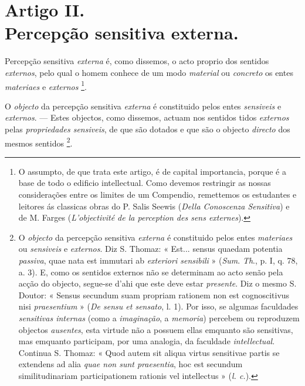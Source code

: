 
\section*{Artigo II.\\ Percepção sensitiva externa.}


Percepção sensitiva \emph{externa} é, como dissemos, o acto proprio dos sentidos \emph{externos}, pelo qual o homem conhece de um modo \emph{material} ou \emph{concreto} os entes \emph{materiaes} e \emph{externos} \footnote{O assumpto, de que trata este artigo, é de capital importancia, porque é a base de todo o edificio intellectual. Como devemos restringir as nossas considerações entre os limites de um Compendio, remettemos os estudantes e leitores ás classicas obras do P. Salis Seewis (\emph{Della Conoscenza Sensitiva}) e de M. Farges (\emph{L'objectivité de la perception des sens externes}).}.


O \emph{objecto} da percepção sensitiva \emph{externa} é constituido pelos entes \emph{sensiveis} e \emph{externos}. --- Estes objectos, como dissemos, actuam nos sentidos   tidos \emph{externos} pelas \emph{propriedades sensiveis}, de que são dotados e que são o objecto \emph{directo} dos mesmos sentidos \footnote{O \emph{objecto} da percepção sensitiva \emph{externa} é constituido pelos entes \emph{materiaes} ou \emph{sensiveis} e \emph{externos}. Diz S. Thomaz: « Est... sensus quaedam potentia \emph{passiva}, quae nata est immutari ab \emph{exteriori sensibili} » (\emph{Sum}. \emph{Th}., p. I, q. 78, a. 3). E, como os sentidos externos não se determinam ao acto senão pela acção do objecto, segue-se d'ahi que este deve estar \emph{presente}. Diz o mesmo S. Doutor: « Sensus secundum suam propriam rationem non est cognoscitivus nisi \emph{praesentium} » (\emph{De sensu et sensato}, l. 1). Por isso, se algumas faculdades \emph{sensitivas internas} (como a \emph{imaginação}, a \emph{memoria}) percebem ou reproduzem objectos \emph{ausentes}, esta virtude não a possuem ellas emquanto são sensitivas, mas emquanto participam, por uma analogia, da faculdade \emph{intellectual}. Continua S. Thomaz: « Quod autem sit aliqua virtus sensitivae partis se extendens ad alia \emph{quae non sunt praesentia}, hoc est secundum similitudinariam participationem rationis vel intellectus » (\emph{l. c.}).}.

